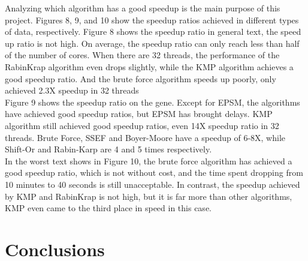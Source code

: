 \documentclass[11pt]{article}       %
\newcommand{\includeFig}[3]      {\begin{figure}[htb] \begin{center}
                                 \includegraphics
                                 [width=4in,keepaspectratio] %
                                 {#2}\caption{\label{#1}#3} \end{center} \end{figure}}
\begin{document}
Analyzing which algorithm has a good speedup is the main purpose of this project. Figures 8, 9, and 10 show the speedup ratios achieved in different types of data, respectively. Figure 8 shows the speedup ratio in general text, the speed up ratio is not high. On average, the speedup ratio can only reach less than half of the number of cores. When there are 32 threads, the performance of the RabinKrap algorithm even drops slightly, while the KMP algorithm achieves a good speedup ratio. And the brute force algorithm speeds up poorly, only achieved 2.3X speedup in 32 threads\\ 
Figure 9 shows the speedup ratio on the gene. Except for EPSM, the algorithms have achieved good speedup ratios, but EPSM has brought delays. KMP algorithm still achieved good speedup ratios, even 14X speedup ratio in 32 threads. Brute Force, SSEF and Boyer-Moore have a speedup of 6-8X, while Shift-Or and Rabin-Karp are 4 and 5 times respectively.\\
In the worst text shows in Figure 10, the brute force algorithm has achieved a good speedup ratio, which is not without cost, and the time spent dropping from 10 minutes to 40 seconds is still unacceptable. In contrast, the speedup achieved by KMP and RabinKrap is not high, but it is far more than other algorithms, KMP even came to the third place in speed in this case.








\section{Conclusions} \label{concl}
\end{document}
